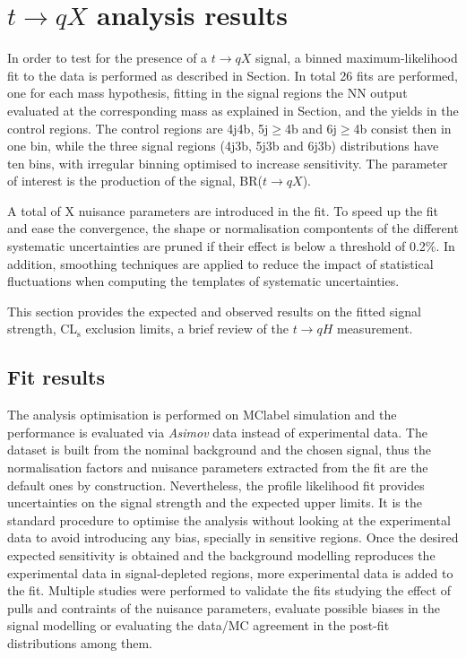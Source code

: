 \chapter{$t\to qX$ analysis results}
In order to test for the presence of a $t\to qX$ signal, a binned maximum-likelihood fit to the data is performed as described in Section. In total 26 fits are performed, one for each mass hypothesis, fitting in the signal regions the NN output evaluated at the corresponding mass as explained in Section, and the yields in the control regions. The control regions are 4j4b, 5j$\geq$4b and 6j$\geq$4b consist then in one bin, while the three signal regions (4j3b, 5j3b and 6j3b) distributions have ten bins, with irregular binning optimised to increase sensitivity. The parameter of interest is the production of the signal, BR($t\to qX$).

A total of X nuisance parameters are introduced in the fit. To speed up the fit and ease the convergence, the shape or normalisation compontents of the different systematic uncertainties are pruned if their effect is below a threshold of 0.2\%. In addition, smoothing techniques are applied to reduce the impact of statistical fluctuations when computing the templates of systematic uncertainties.

This section provides the expected and observed results on the fitted signal strength, CL$_{\text{s}}$ exclusion limits, a brief review of the $t\to qH$ measurement.

\section{Fit results}

The analysis optimisation is performed on \acrshort{MClabel} simulation and the performance is evaluated via \textit{Asimov} data instead of experimental data. The dataset is built from the nominal background and the chosen signal, thus the normalisation factors and nuisance parameters extracted from the fit are the default ones by construction. Nevertheless, the profile likelihood fit provides uncertainties on the signal strength and the expected upper limits. It is the standard procedure to optimise the analysis without looking at the experimental data to avoid introducing any bias, specially in sensitive regions. Once the desired expected sensitivity is obtained and the background modelling reproduces the experimental data in signal-depleted regions, more experimental data is added to the fit. Multiple studies were performed to validate the fits studying the effect of pulls and contraints of the nuisance parameters, evaluate possible biases in the signal modelling or evaluating the data/MC agreement in the post-fit distributions among them.

